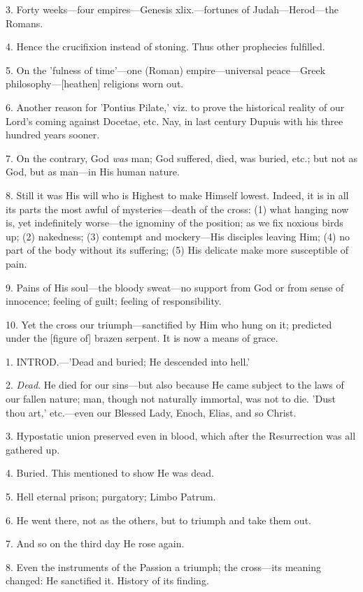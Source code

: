 3. Forty weeks—four empires—Genesis xlix.—fortunes
of Judah—Herod—the Romans.

4. Hence the crucifixion instead of stoning. Thus
other prophecies fulfilled.

5. On the 'fulness of time'—one (Roman)
empire—universal peace—Greek philosophy—[heathen] religions worn
out.

6. Another reason for 'Pontius Pilate,' viz. to
prove the historical reality of our Lord's coming against Docetae,
etc. Nay, in last century Dupuis with his three hundred years sooner.

7. On the contrary, God \emph{was} man; God
suffered, died, was buried, etc.; but not as God, but as man—in His
human nature.

8. Still it was His will who is Highest to make
Himself lowest. Indeed, it is in all its parts the most awful of
mysteries—death of the cross: (1) what hanging now is, yet
indefinitely worse—the ignominy of the position; as we fix noxious
birds up; (2) nakedness; (3) contempt and mockery—His disciples
leaving Him; (4) no part of the body without its suffering; (5) His
delicate make more susceptible of pain.

9. Pains of His soul—the bloody sweat—no
support from God or from sense of innocence; feeling of guilt; feeling
of responsibility.

10. Yet the cross our triumph—sanctified by Him
who hung on it; predicted under the [figure of] brazen serpent.
It is now a means of grace.


1. INTROD.—'Dead
and buried; He descended into hell.'

2. \emph{Dead}. He died for our sins—but also
because He came subject to the laws of our fallen nature; man, though
not naturally immortal, was not to die. 'Dust thou art,' etc.—even
our Blessed Lady, Enoch, Elias, and so Christ.

3. Hypostatic union preserved even in blood,
which after the Resurrection was all gathered up.

4. Buried. This mentioned to show He was dead.

5. Hell eternal prison; purgatory; Limbo Patrum.

6. He went there, not as the others, but to
triumph and take them out.

7. And so on the third day He rose again.

8. Even the instruments of the Passion a triumph;
the cross—its meaning changed: He sanctified it. History of its
finding.

